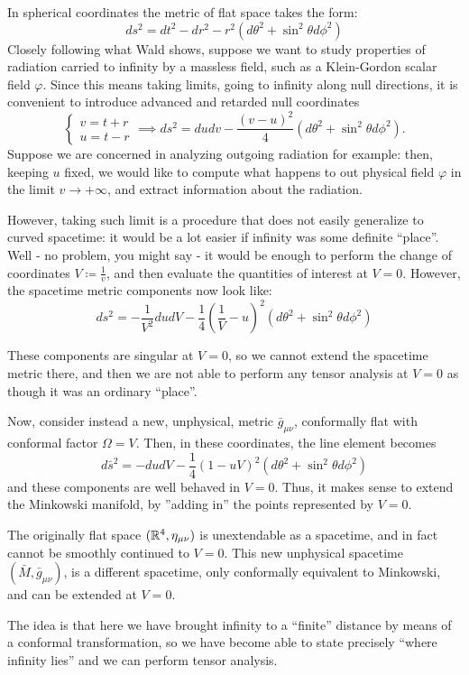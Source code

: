 In spherical coordinates the metric of flat space takes the form:
\[
ds^2 = dt^2 - dr^2 - r^2(d\theta^2 + \sin^2\theta d\phi^2)
\]
Closely following what Wald \cite{wald2010general} shows, suppose we want to study properties of radiation carried to infinity by a massless field, such as a Klein-Gordon scalar field \(\varphi\). Since this means taking limits, going to infinity along null directions, it is convenient to introduce advanced and retarded null coordinates
\[
\begin{cases}
	 v = t + r\\
	 u = t - r
\end{cases}
\implies 
ds^2 = dudv - \frac{(v - u)^2}{4}(d\theta^2 + \sin^2\theta d\phi^2).
\]
Suppose we are concerned in analyzing outgoing radiation for example: then, keeping \(u\) fixed, we would like to compute what happens to out physical field \(\varphi\) in the limit \(v \rightarrow +\infty\), and extract information about the radiation.

However, taking such limit is a procedure that does not easily generalize to curved spacetime: it would be a lot easier if infinity was some definite ``place''. Well - no problem, you might say - it would be enough to perform the change of coordinates \(V\coloneqq \frac{1}{v}\), and then evaluate the quantities of interest at \(V = 0\). However, the spacetime metric components now look like:
\[
ds^2 = -\frac{1}{V^2}dudV - \frac{1}{4}\left(\frac{1}{V} - u\right)^2 (d\theta^2 + \sin^2\theta d\phi^2)
\]

These components are singular at \(V = 0\), so we cannot extend the spacetime metric there, and then we are not able to perform any tensor analysis at \(V = 0\) as though it was an ordinary ``place''. 

Now, consider instead a new, unphysical, metric \(\bar{g}_{\mu\nu}\), conformally flat with conformal factor \(\Omega = V\). Then, in these coordinates, the line element becomes
\[
d\bar{s}^2 = -dudV - \frac{1}{4}\left(1- uV\right)^2 (d\theta^2 + \sin^2\theta d\phi^2)
\]
and these components are well behaved in \(V = 0\). Thus, it makes sense to extend the Minkowski manifold, by ''adding in'' the points represented by \(V = 0\).
\begin{remark}
	The originally flat space \(({\mathbb{R}}^4, \eta_{\mu\nu})\) is unextendable as a spacetime, and in fact cannot be smoothly continued to \(V = 0\). This new unphysical spacetime \((\bar{M},\bar{g}_{\mu\nu} )\), is a different spacetime, only conformally equivalent to Minkowski, and can be extended at \(V = 0\).
\end{remark}
The idea is that here we have brought infinity to a ``finite'' distance by means of a conformal transformation, so we have become able to state precisely ``where infinity lies'' and we can perform tensor analysis.

